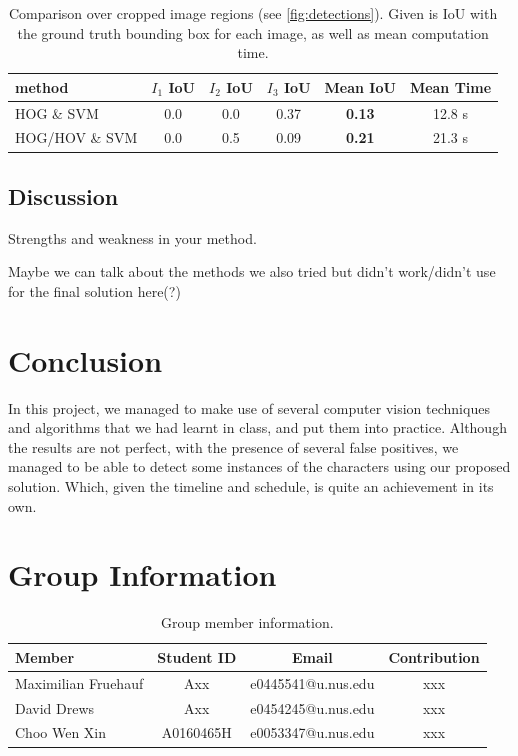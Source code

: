 \documentclass[11pt]{article}
\begin{document}
\begin{table}
    \centering
    \begin{tabular}{lccccc}
        \toprule
        method & \( I_1 \) IoU & \( I_2 \) IoU & \( I_3 \) IoU & Mean IoU & Mean Time \\
        \midrule
        HOG \& SVM              & 0.0   & 0.0 & 0.37 & \textbf{0.13} & 12.8 s \\
        HOG/HOV \& SVM          &  0.0  & 0.5 & 0.09 & \textbf{0.21} & 21.3 s \\
        \bottomrule
    \end{tabular}
    \caption{Comparison over cropped image regions (see \autoref{fig:detections}). Given is IoU with the ground truth bounding box for each image,
    as well as mean computation time.}
    \label{tab:class-iou}
\end{table}

\subsection{Discussion}
Strengths and weakness in your method.

Maybe we can talk about the methods we also tried but didn't work/didn't use for the final solution here(?)

\section{Conclusion}
In this project, we managed to make use of several computer vision techniques and algorithms that we had learnt in class, and put them into practice. Although the results are not perfect, with the presence of several false positives, we managed to be able to detect some instances of the characters using our proposed solution. Which, given the timeline and schedule, is quite an achievement in its own.

\section{Group Information}
\begin{table}[ht]
    \centering
    \begin{tabular}{lccc}
    \toprule
     Member & Student ID & Email & Contribution\\
    \midrule
    Maximilian Fruehauf& Axx & e0445541@u.nus.edu & xxx \\
    David Drews& Axx &e0454245@u.nus.edu & xxx  \\
    Choo Wen Xin& A0160465H & e0053347@u.nus.edu & xxx  \\
    \bottomrule
    \end{tabular}
    \caption{Group member information.}
    \label{tab:dataset}
\end{table}




 
\end{document}
